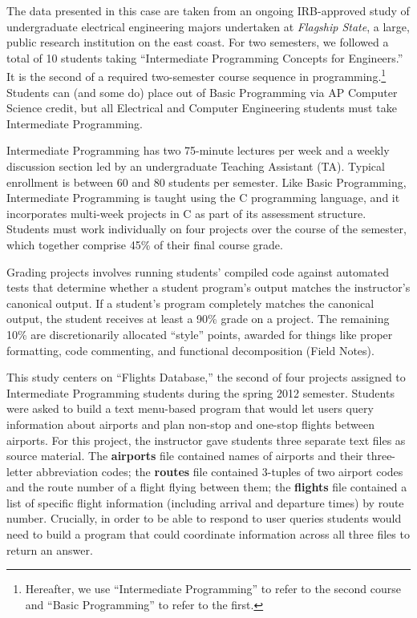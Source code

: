 The data presented in this case are taken from an ongoing IRB-approved
study of undergraduate electrical engineering majors undertaken at
\emph{Flagship State}, a large, public research institution on the east
coast. For two semesters, we followed a total of 10 students taking
``Intermediate Programming Concepts for Engineers.'' It is the second of
a required two-semester course sequence in programming.\footnote{Hereafter,
  we use ``Intermediate Programming'' to refer to the second course and
  ``Basic Programming'' to refer to the first.} Students can (and some
do) place out of Basic Programming via AP Computer Science credit, but
all Electrical and Computer Engineering students must take Intermediate
Programming.

Intermediate Programming has two 75-minute lectures per week and a
weekly discussion section led by an undergraduate Teaching Assistant
(TA). Typical enrollment is between 60 and 80 students per semester.
Like Basic Programming, Intermediate Programming is taught using the C
programming language, and it incorporates multi-week projects in C as
part of its assessment structure. Students must work individually on
four projects over the course of the semester, which together comprise
45\% of their final course grade.

Grading projects involves running students' compiled code against
automated tests that determine whether a student program's output
matches the instructor's canonical output. If a student's program
completely matches the canonical output, the student receives at least a
90\% grade on a project. The remaining 10\% are discretionarily
allocated ``style'' points, awarded for things like proper formatting,
code commenting, and functional decomposition (Field Notes).

This study centers on ``Flights Database,'' the second of four projects
assigned to Intermediate Programming students during the spring 2012
semester. Students were asked to build a text menu-based program that
would let users query information about airports and plan non-stop and
one-stop flights between airports. For this project, the instructor gave
students three separate text files as source material. The
\textbf{airports} file contained names of airports and their
three-letter abbreviation codes; the \textbf{routes} file contained
3-tuples of two airport codes and the route number of a flight flying
between them; the \textbf{flights} file contained a list of specific
flight information (including arrival and departure times) by route
number. Crucially, in order to be able to respond to user queries
students would need to build a program that could coordinate information
across all three files to return an answer.

